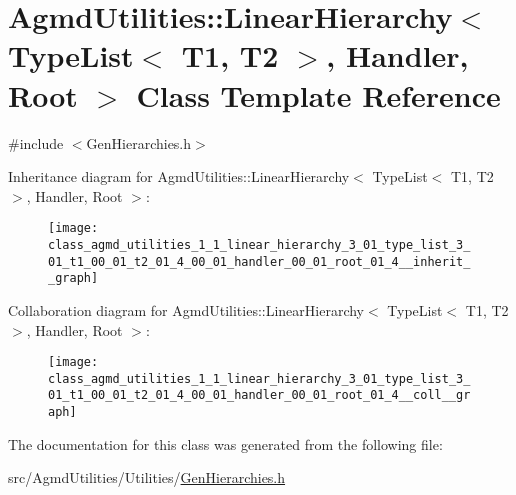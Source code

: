 \hypertarget{class_agmd_utilities_1_1_linear_hierarchy_3_01_type_list_3_01_t1_00_01_t2_01_4_00_01_handler_00_01_root_01_4}{\section{Agmd\+Utilities\+:\+:Linear\+Hierarchy$<$ Type\+List$<$ T1, T2 $>$, Handler, Root $>$ Class Template Reference}
\label{class_agmd_utilities_1_1_linear_hierarchy_3_01_type_list_3_01_t1_00_01_t2_01_4_00_01_handler_00_01_root_01_4}
}


{\ttfamily \#include $<$Gen\+Hierarchies.\+h$>$}



Inheritance diagram for Agmd\+Utilities\+:\+:Linear\+Hierarchy$<$ Type\+List$<$ T1, T2 $>$, Handler, Root $>$\+:\nopagebreak
\begin{figure}[H]
\begin{center}
\leavevmode
\texttt{[image: class\_agmd\_utilities\_1\_1\_linear\_hierarchy\_3\_01\_type\_list\_3\_01\_t1\_00\_01\_t2\_01\_4\_00\_01\_handler\_00\_01\_root\_01\_4\_\_inherit\_\_graph]}
\end{center}
\end{figure}


Collaboration diagram for Agmd\+Utilities\+:\+:Linear\+Hierarchy$<$ Type\+List$<$ T1, T2 $>$, Handler, Root $>$\+:\nopagebreak
\begin{figure}[H]
\begin{center}
\leavevmode
\texttt{[image: class\_agmd\_utilities\_1\_1\_linear\_hierarchy\_3\_01\_type\_list\_3\_01\_t1\_00\_01\_t2\_01\_4\_00\_01\_handler\_00\_01\_root\_01\_4\_\_coll\_\_graph]}
\end{center}
\end{figure}


The documentation for this class was generated from the following file\+:\begin{DoxyCompactItemize}
\item 
src/\+Agmd\+Utilities/\+Utilities/\hyperlink{_gen_hierarchies_8h}{Gen\+Hierarchies.\+h}\end{DoxyCompactItemize}

